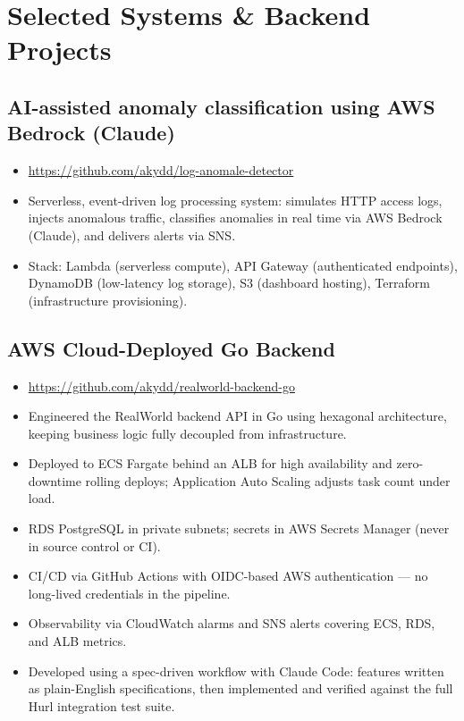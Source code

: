\documentclass[10pt]{article}
\begin{document}
\section{Selected Systems \& Backend Projects}

\subsection{AI-assisted anomaly classification using AWS Bedrock (Claude)}
\begin{itemize}
  \item \url{https://github.com/akydd/log-anomale-detector}
  \item Serverless, event-driven log processing system: simulates HTTP access logs, injects anomalous traffic, classifies anomalies in real time via AWS Bedrock (Claude), and delivers alerts via SNS.
  \item Stack: Lambda (serverless compute), API Gateway (authenticated endpoints), DynamoDB (low-latency log storage), S3 (dashboard hosting), Terraform (infrastructure provisioning).
\end{itemize}

\subsection{AWS Cloud-Deployed Go Backend}

\begin{itemize}
  \item \url{https://github.com/akydd/realworld-backend-go}
  \item Engineered the RealWorld backend API in Go using hexagonal architecture, keeping business logic fully decoupled from infrastructure.
  \item Deployed to ECS Fargate behind an ALB for high availability and zero-downtime rolling deploys; Application Auto Scaling adjusts task count under load.
  \item RDS PostgreSQL in private subnets; secrets in AWS Secrets Manager (never in source control or CI).
  \item CI/CD via GitHub Actions with OIDC-based AWS authentication --- no long-lived credentials in the pipeline.
  \item Observability via CloudWatch alarms and SNS alerts covering ECS, RDS, and ALB metrics.
  \item Developed using a spec-driven workflow with Claude Code: features written as plain-English specifications, then implemented and verified against the full Hurl integration test suite.
\end{itemize}
\end{document}
